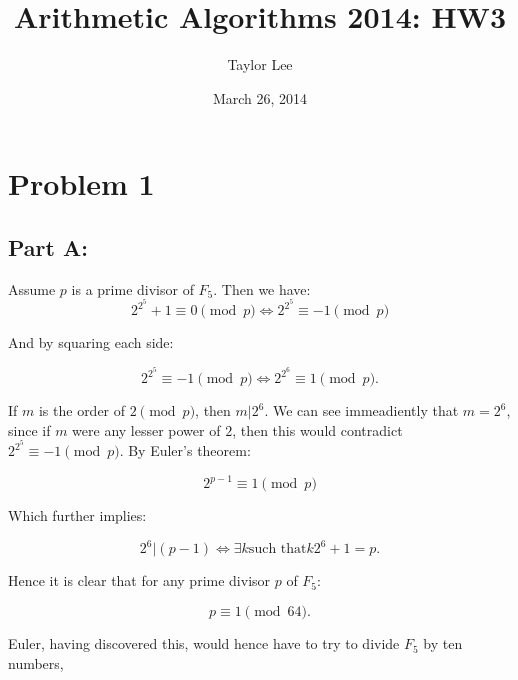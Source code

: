\documentclass[12pt]{article}
\theoremstyle{moo}
\begin{document}
\fontseries {\seriesdefault}
\fontshape {\shapedefault}
\selectfont

\title{ Arithmetic Algorithms 2014: HW3}
\date{March 26, 2014}         %
\author{Taylor Lee}      %
\maketitle                      %




\section*{Problem 1}


\subsection*{Part A:}
Assume $p$ is a prime divisor of $F_5$. Then we have:
\[
2^{2^5} + 1 \equiv 0 \pmod{p} \iff 2^{2^5}  \equiv -1 \pmod{p}
\]

And by squaring each side:

\[
 2^{2^5}  \equiv -1 \pmod{p} \iff 2^{2^6} \equiv 1 \pmod{p}.
\]

If $m$ is the order of $2 \pmod{p}$, then $m|2^6$. We can see immeadiently that $m=2^6$, since if $m$ were any lesser power of $2$, then this would contradict $2^{2^5}  \equiv -1 \pmod{p}$. By Euler's theorem:

\[
2^{p-1} \equiv 1 \pmod{p}
\]

Which further implies:

\[
2^6 | (p-1) \iff \exists k \text{such that} k2^6 + 1 = p.
\]

Hence it is clear that for any prime divisor $p$ of $F_5$:

\[
p \equiv 1 \pmod{64}.
\]

Euler, having discovered this, would hence have to try to divide $F_5$ by ten numbers,
\end{document}
